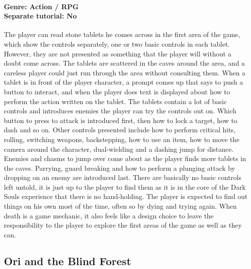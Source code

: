 \paragraph{Genre: Action / RPG \\ Separate tutorial: No \\}
The player can read stone tablets he comes across in the first area of the game, which show the controls separately, one or two basic controls in each tablet. However, they are not presented as something that the player will without a doubt come across. The tablets are scattered in the caves around the area, and a careless player could just run through the area without consulting them. When a tablet is in front of the player character, a prompt comes up that says to push a button to interact, and when the player does text is displayed about how to perform the action written on the tablet. The tablets contain a lot of basic controls and introduces enemies the player can try the controls out on. Which button to press to attack is introduced first, then how to lock a target, how to dash and so on. Other controls presented include how to perform critical hits, rolling, switching weapons, backstepping, how to use an item, how to move the camera around the character, dual-wielding and a dashing jump for distance. Enemies and chasms to jump over come about as the player finds more tablets in the caves. Parrying, guard breaking and how to perform a plunging attack by dropping on an enemy are introduced last. There are basically no basic controls left untold, it is just up to the player to find them as it is in the core of the Dark Souls experience that there is no hand-holding. The player is expected to find out things on his own most of the time, often so by dying and trying again. When death is a game mechanic, it also feels like a design choice to leave the responsibility to the player to explore the first areas of the game as well as they can.

\subsection{Ori and the Blind Forest}
